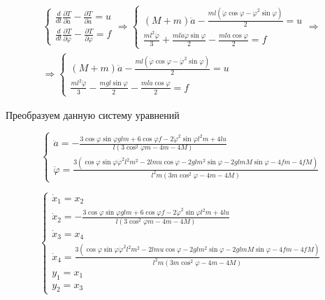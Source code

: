\begin{multline}
    \begin{cases}
        \frac{d}{dt} \frac{\partial T}{\partial \dot{a}} - \frac{\partial T}{\partial a} = u\\
         \frac{d}{dt} \frac{\partial T}{\partial \dot{\varphi}} - \frac{\partial T}{\partial \varphi} = f
    \end{cases} \Rightarrow 
    \begin{cases}
        \left(M+m \right) \ddot{a} - \frac{ml(\ddot{\varphi} \cos \varphi - \dot{\varphi}^2 \sin \varphi)}{2} = u\\
        \frac{ml^2 \ddot{\varphi}}{3} +\frac{ml \dot{a} \dot{\varphi} \sin \varphi}{2} - \frac{ml \ddot{a} \cos \varphi}{2} = f
    \end{cases} \Rightarrow\\ \Rightarrow
     \begin{cases}
        \left(M+m \right) \ddot{a} - \frac{ml(\ddot{\varphi} \cos \varphi - \dot{\varphi}^2 \sin \varphi)}{2} = u\\
        \frac{ml^2 \ddot{\varphi}}{3} -\frac{mgl \sin \varphi}{2} - \frac{ml \ddot{a} \cos \varphi}{2} = f
    \end{cases}
\end{multline}

Преобразуем данную систему уравнений

\begin{equation}
\begin{cases}
    \ddot{a} = - \frac{3 \cos{\varphi} \sin {\varphi} g lm + 6 \cos{\varphi}f-2 \dot{\varphi}^2\sin{\varphi}l^2m+4lu}{l(3 \cos^2 \varphi m - 4m -4M)}\\[2ex]
    \ddot{\varphi} = \frac{3(\cos \varphi \sin \varphi \dot{\varphi}^2l^2m^2-2lmu \cos{\varphi}-2glm^2 \sin{\varphi} - 2 glmM \sin{\varphi} - 4fm - 4fM)}{l^2m(3m \cos^2 \varphi -4m-4M)}
    \end{cases}
\end{equation}


\begin{equation}
\label{1_model_full}
    \begin{cases}
        \dot{x}_1 = x_2\\
        \dot{x}_2 = - \frac{3 \cos{\varphi} \sin {\varphi} g lm + 6 \cos{\varphi}f-2 \dot{\varphi}^2\sin{\varphi}l^2m+4lu}{l(3 \cos^2 \varphi m - 4m -4M)}\\
        \dot{x}_3 = x_4\\
        \dot{x}_4  = \frac{3(\cos \varphi \sin \varphi \dot{\varphi}^2l^2m^2-2lmu \cos{\varphi}-2glm^2 \sin{\varphi} - 2 glmM \sin{\varphi} - 4fm - 4fM)}{l^2m(3m \cos^2 \varphi -4m-4M)}\\
        y_1 = x_1\\
        y_2 = x_3
    \end{cases}
\end{equation}


